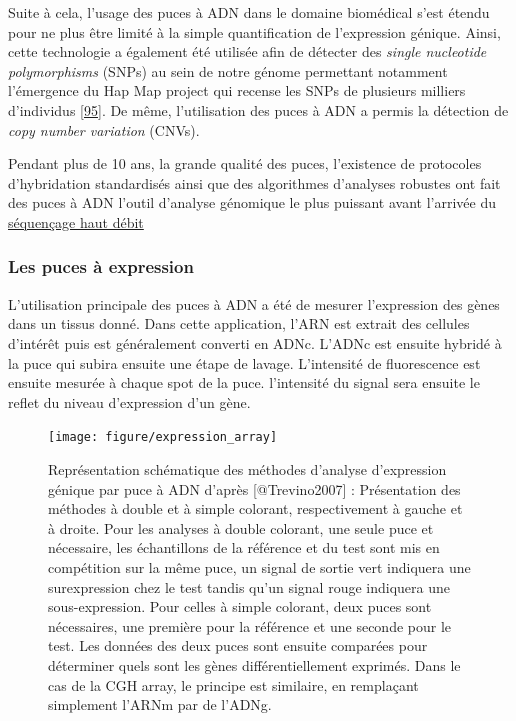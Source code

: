 \documentclass[12pt,twoside]{reedthesis}
\theoremstyle{definition}
\theoremstyle{definition}
\theoremstyle{remark}
\begin{document}
  Suite à cela, l'usage des puces à ADN dans le domaine biomédical s'est
  étendu pour ne plus être limité à la simple quantification de
  l'expression génique. Ainsi, cette technologie a également été utilisée
  afin de détecter des \emph{single nucleotide polymorphisms} (SNPs) au
  sein de notre génome permettant notamment l'émergence du Hap Map project
  qui recense les SNPs de plusieurs milliers d'individus
  {[}\protect\hyperlink{ref-Cutler2001}{95}{]}. De même, l'utilisation des
  puces à ADN a permis la détection de \emph{copy number variation}
  (CNVs).
  
  Pendant plus de 10 ans, la grande qualité des puces, l'existence de
  protocoles d'hybridation standardisés ainsi que des algorithmes
  d'analyses robustes ont fait des puces à ADN l'outil d'analyse génomique
  le plus puissant avant l'arrivée du \protect\hyperlink{ngs}{séquençage
  haut débit}
  
  \newpage
  
  \subsubsection{Les puces à expression}\label{les-puces-a-expression}
  
  L'utilisation principale des puces à ADN a été de mesurer l'expression
  des gènes dans un tissus donné. Dans cette application, l'ARN est
  extrait des cellules d'intérêt puis est généralement converti en ADNc.
  L'ADNc est ensuite hybridé à la puce qui subira ensuite une étape de
  lavage. L'intensité de fluorescence est ensuite mesurée à chaque spot de
  la puce. l'intensité du signal sera ensuite le reflet du niveau
  d'expression d'un gène.
  
  \begin{figure}
  
  {\centering \texttt{[image: figure/expression\_array]} 
  
  }
  
  \caption[Représentation schématique des méthodes d'analyse d'expression génique par puce à ADN]{Représentation schématique des méthodes d'analyse d'expression génique par puce à ADN d'après [@Trevino2007] : Présentation des méthodes à double et à simple colorant, respectivement à gauche et à droite. Pour les analyses à double colorant, une seule puce et nécessaire, les échantillons de la référence et du test sont mis en compétition sur la même puce, un signal de sortie vert indiquera une surexpression chez le test tandis qu'un signal rouge indiquera une sous-expression. Pour celles à simple colorant, deux puces sont nécessaires, une première pour la référence et une seconde pour le test. Les données des deux puces sont ensuite comparées pour déterminer quels sont les gènes différentiellement exprimés. Dans le cas de la CGH array, le principe est similaire, en remplaçant simplement l'ARNm par de l'ADNg.}\label{fig:figexparray}
  \end{figure}
  
\end{document}
